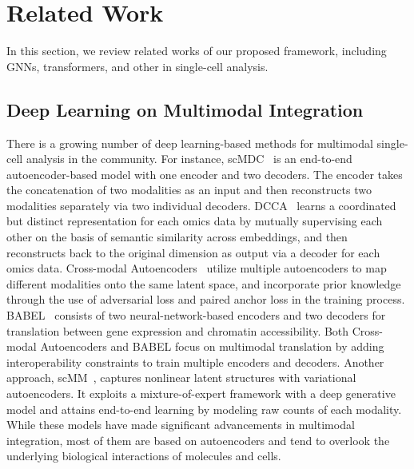 \section{Related Work}
In this section, we review related works of our proposed framework, including GNNs, transformers, and other in single-cell analysis.

\subsection{Deep Learning on Multimodal Integration} 
There is a growing number of deep learning-based methods for multimodal single-cell analysis in the community. For instance,
scMDC~\cite{lin2022clustering} is an end-to-end autoencoder-based model with one encoder and two decoders. The encoder takes the concatenation of two modalities as an input and then reconstructs two modalities separately via two individual decoders.
DCCA~\cite{zuo2021deep} learns a coordinated but distinct representation for each omics data by mutually supervising each other on the basis of semantic similarity across embeddings, and then reconstructs back to the original dimension as output via a decoder for each omics data.
Cross-modal Autoencoders~\cite{yang2021multi} utilize multiple autoencoders to map different modalities onto the same latent space, and incorporate prior knowledge through the use of adversarial loss and paired anchor loss in the training process. 
BABEL~\cite{wu2021babel} consists of two neural-network-based encoders and two decoders for translation between gene expression and chromatin accessibility. Both Cross-modal Autoencoders and BABEL focus on multimodal translation by adding interoperability constraints to train multiple encoders and decoders. 
Another approach, scMM~\cite{minoura2021mixture}, captures nonlinear latent structures with variational autoencoders. It exploits a mixture-of-expert framework with a deep generative model and attains end-to-end learning by modeling raw counts of each modality. While these models have made significant advancements in multimodal integration, most of them are based on autoencoders and tend to overlook the underlying biological interactions of molecules and cells.

